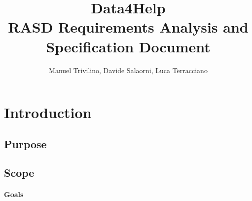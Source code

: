 \documentclass[a4paper]{article}
\begin{document}
\author{Manuel Trivilino, Davide Salaorni, Luca Terracciano}

\title{\Large Data4Help\\
\Large RASD Requirements Analysis and Specification Document
}

\maketitle
\newpage

\tableofcontents
\newpage

\section{Introduction}

\subsection{Purpose}

\subsection{Scope}

\paragraph{Goals}
\end{document}
